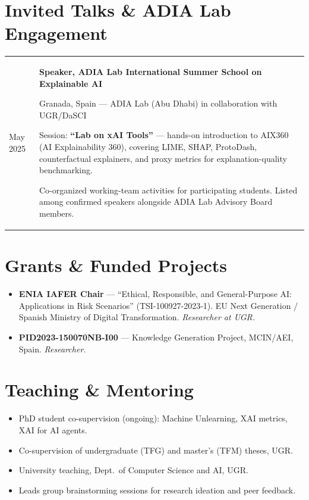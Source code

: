 \documentclass[11pt,a4paper]{article}
\makeatletter
\newcommand{\entry}[2]{%
  \noindent
  \begin{tabularx}{\textwidth}{@{}p{0.18\textwidth}@{\hspace{0.02\textwidth}}X@{}}
    #1 & #2
  \end{tabularx}
  \par\vspace{0.15em}
}
\newcommand{\subt}[1]{{\color{subtitle}\small #1}\par}
\makeatother
\begin{document}
\section*{Invited Talks \& ADIA Lab Engagement}

\entry{May 2025}{%
  \textbf{Speaker, ADIA Lab International Summer School on Explainable AI} \par
  \subt{Granada, Spain --- ADIA Lab (Abu Dhabi) in collaboration with UGR/DaSCI} \par
  \subt{Session: \textbf{``Lab on xAI Tools''} --- hands-on introduction to AIX360 (AI Explainability 360), covering LIME, SHAP, ProtoDash, counterfactual explainers, and proxy metrics for explanation-quality benchmarking.} \par
  \subt{Co-organized working-team activities for participating students. Listed among confirmed speakers alongside ADIA Lab Advisory Board members.}
}

\section*{Grants \& Funded Projects}

\begin{itemize}
  \item \textbf{ENIA IAFER Chair} --- ``Ethical, Responsible, and General-Purpose AI: Applications in Risk Scenarios'' (TSI-100927-2023-1). EU Next Generation / Spanish Ministry of Digital Transformation. \textit{Researcher at UGR.}
  \item \textbf{PID2023-150070NB-I00} --- Knowledge Generation Project, MCIN/AEI, Spain. \textit{Researcher.}
\end{itemize}

\section*{Teaching \& Mentoring}

\begin{itemize}
  \item PhD student co-supervision (ongoing): Machine Unlearning, XAI metrics, XAI for AI agents.
  \item Co-supervision of undergraduate (TFG) and master's (TFM) theses, UGR.
  \item University teaching, Dept.~of Computer Science and AI, UGR.
  \item Leads group brainstorming sessions for research ideation and peer feedback.
\end{itemize}
\end{document}
